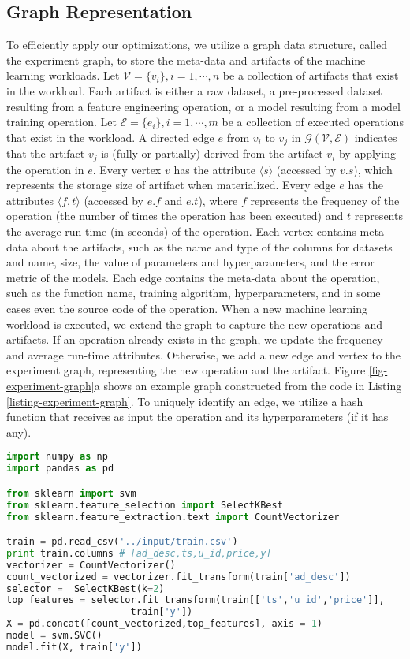 \subsection{Graph Representation}\label{sub-graph-construction}
To efficiently apply our optimizations, we utilize a graph data structure, called the experiment graph, to store the meta-data and artifacts of the machine learning workloads.
Let $\mathcal{V}=\{v_i\}, i = 1, \cdots, n$ be a collection of artifacts that exist in the workload.
Each artifact is either a raw dataset, a pre-processed dataset resulting from a feature engineering operation, or a model resulting from a model training operation.
Let $\mathcal{E}=\{e_i\}, i = 1, \cdots, m$ be a collection of executed operations that exist in the workload.
A directed edge $e$ from $v_i$ to $v_j$ in $\mathcal{G}(\mathcal{V},\mathcal{E})$ indicates that the artifact $v_j$ is (fully or partially) derived from the artifact $v_i$ by applying the operation in $e$.
Every vertex $v$ has the attribute $\langle s \rangle$ (accessed by $v.s$), which represents the storage size of artifact when materialized.
Every edge $e$ has the attributes $\langle f, t\rangle$ (accessed by $e.f$ and $e.t$), where $f$ represents the frequency of the operation (the number of times the operation has been executed) and $t$ represents the average run-time (in seconds) of the operation.
Each vertex contains meta-data about the artifacts, such as the name and type of the columns for datasets and name, size, the value of parameters and hyperparameters, and the error metric of the models.
Each edge contains the meta-data about the operation, such as the function name, training algorithm, hyperparameters, and in some cases even the source code of the operation.
When a new machine learning workload is executed, we extend the graph to capture the new operations and artifacts.
If an operation already exists in the graph, we update the frequency and average run-time attributes.
Otherwise, we add a new edge and vertex to the experiment graph, representing the new operation and the artifact.
Figure \ref{fig-experiment-graph}a shows an example graph constructed from the code in Listing \ref{listing-experiment-graph}.
To uniquely identify an edge, we utilize a hash function that receives as input the operation and its hyperparameters (if it has any).

\begin{lstlisting}[language=Python, caption=Example script,captionpos=b,label = {listing-experiment-graph}]
import numpy as np
import pandas as pd

from sklearn import svm
from sklearn.feature_selection import SelectKBest
from sklearn.feature_extraction.text import CountVectorizer

train = pd.read_csv('../input/train.csv') 
print train.columns # [ad_desc,ts,u_id,price,y]
vectorizer = CountVectorizer()
count_vectorized = vectorizer.fit_transform(train['ad_desc'])
selector =  SelectKBest(k=2)
top_features = selector.fit_transform(train[['ts','u_id','price']], 
				      train['y'])
X = pd.concat([count_vectorized,top_features], axis = 1)
model = svm.SVC()
model.fit(X, train['y'])
\end{lstlisting}

